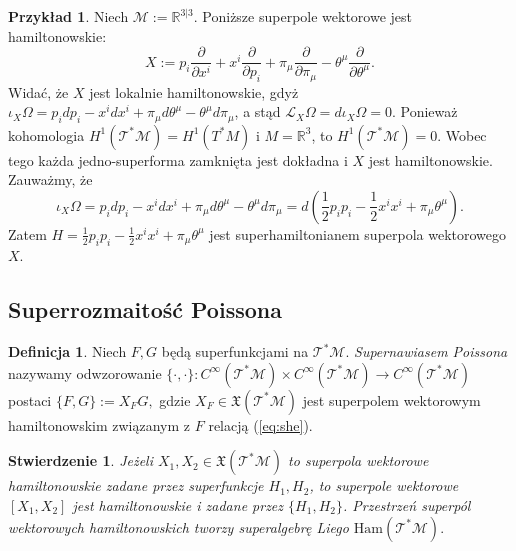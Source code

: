 \documentclass[11pt,a4paper]{report}
\newtheorem{proposition}[theorem]{Stwierdzenie}
\theoremstyle{definition}
\newtheorem{example}[theorem]{Przykład}
\newtheorem{definition}[theorem]{Definicja}
\begin{document}
\begin{example}
 Niech $\mathcal{M}:= \mathbb{R}^{3|3}$. Poniższe superpole wektorowe jest hamiltonowskie:
 \begin{equation*}
  X := p_i \frac{\partial}{\partial x^i} + x^i \frac{\partial}{\partial p_i} + \pi_\mu \frac{\partial}{\partial \pi_\mu} - \theta^\mu \frac{\partial}{\partial \theta^\mu}.
 \end{equation*}
 Widać, że $X$ jest lokalnie hamiltonowskie, gdyż $\iota_X \Omega = p_i dp_i - x^i dx^i + \pi_\mu d\theta^\mu - \theta^\mu d\pi_\mu$, a stąd $\mathcal{L}_X \Omega = d \iota_X \Omega = 0$. Ponieważ kohomologia $H^1(\mathcal{T^*M}) = H^1(T^*M)$ i $M=\mathbb{R}^3$, to $H^1(\mathcal{T^*M}) = 0$. Wobec tego każda jedno-superforma zamknięta jest dokładna i $X$ jest hamiltonowskie. Zauważmy, że
 \begin{equation*}
 \iota_X \Omega = p_i dp_i - x^i dx^i + \pi_\mu d\theta^\mu - \theta^\mu d\pi_\mu = d \left( \frac12 p_i p_i - \frac12 x^i x^i + \pi_\mu \theta^\mu \right).
 \end{equation*}
 Zatem $H = \frac12 p_i p_i - \frac12 x^i x^i + \pi_\mu \theta^\mu$ jest superhamiltonianem superpola wektorowego $X$.
\end{example}

\subsection{Superrozmaitość Poissona}

\begin{definition}
 Niech $F,G$ będą superfunkcjami na $\mathcal{T^*M}$. \textit{Supernawiasem Poissona} nazywamy odwzorowanie $\{\cdot, \cdot\}: C^\infty (\mathcal{T^*M}) \times C^\infty (\mathcal{T^*M}) \rightarrow C^\infty(\mathcal{T^*M})$ postaci $\{F, G \} :=X_F G,$ gdzie $X_F \in \mathfrak{X}(\mathcal{T^*M})$ jest superpolem wektorowym hamiltonowskim związanym z $F$ relacją (\ref{eq:she}).
\end{definition}

\begin{proposition}
 Jeżeli $X_1, X_2 \in \mathfrak{X}(\mathcal{T^*M})$ to superpola wektorowe hamiltonowskie zadane przez superfunkcje $H_1, H_2$, to superpole wektorowe $[X_1, X_2]$ jest hamiltonowskie i zadane przez $\{H_1, H_2\}$. Przestrzeń superpól wektorowych hamiltonowskich tworzy superalgebrę Liego $\mathrm{Ham}(\mathcal{T^*M}).$
\end{proposition}
\end{document}
